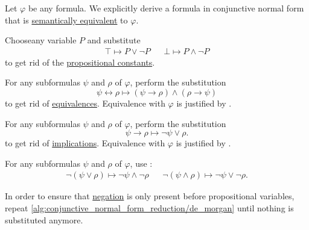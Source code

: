 \begin{algorithm}\label{alg:conjunctive_normal_form_reduction}
  Let \( \varphi \) be any formula. We explicitly derive a formula in conjunctive normal form that is \hyperref[def:propositional_interpretation/equivalence]{semantically equivalent} to \( \varphi \).

  \begin{AlgEnum}
     Choose\AOC any variable \( P \) and substitute
    \begin{align*}
      \top \mapsto P \vee \neg P && \bot \mapsto P \wedge \neg P
    \end{align*}
    to get rid of the \hyperref[def:propositional_alphabet/constants]{propositional constants}.

     For any subformulas \( \psi \) and \( \rho \) of \( \varphi \), perform the substitution
    \begin{equation*}
      \psi \leftrightarrow \rho \mapsto (\psi \rightarrow \rho) \wedge (\rho \rightarrow \psi)
    \end{equation*}
    to get rid of \hyperref[def:propositional_alphabet/connectives/equivalence]{equivalences}. Equivalence with \( \varphi \) is justified by .

     For any subformulas \( \psi \) and \( \rho \) of \( \varphi \), perform the substitution
    \begin{equation*}
      \psi \rightarrow \rho \mapsto \neg \psi \vee \rho.
    \end{equation*}
    to get rid of \hyperref[def:propositional_alphabet/connectives/implication]{implications}. Equivalence with \( \varphi \) is justified by .

     For any subformulas \( \psi \) and \( \rho \) of \( \varphi \), use :
    \begin{align*}
      \neg(\psi \vee \rho) \mapsto \neg \psi \wedge \neg \rho
      &&
      \neg(\psi \wedge \rho) \mapsto \neg \psi \vee \neg \rho.
    \end{align*}

    In order to ensure that \hyperref[def:propositional_alphabet/negation]{negation} is only present before propositional variables, repeat \ref{alg:conjunctive_normal_form_reduction/de_morgan} until nothing is substituted anymore.


\end{AlgEnum}
\end{algorithm}
